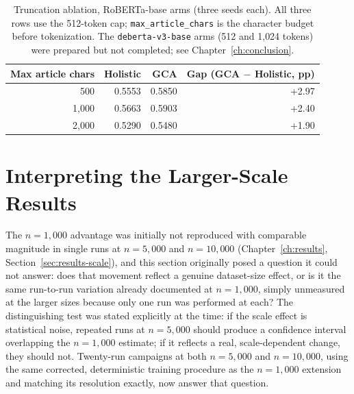 \begin{table}[htbp]
\centering
\caption[Truncation ablation, RoBERTa-base arms]{Truncation ablation, RoBERTa-base arms (three seeds each). All three
rows use the 512-token cap; \texttt{max\_article\_chars} is the character budget
before tokenization. The \texttt{deberta-v3-base} arms (512 and 1{,}024 tokens)
were prepared but not completed; see Chapter~\ref{ch:conclusion}.}
\label{tab:truncation-ablation}
\begin{tabular}{rrrr}
\toprule
Max article chars & Holistic & GCA & Gap (GCA $-$ Holistic, pp) \\
\midrule
500   & 0.5553 & 0.5850 & +2.97 \\
1{,}000 & 0.5663 & 0.5903 & +2.40 \\
2{,}000 & 0.5290 & 0.5480 & +1.90\footnotemark \\
\bottomrule
\end{tabular}
\end{table}

\section{Interpreting the Larger-Scale Results}
\label{sec:disc-scale}

The $n=1{,}000$ advantage was initially not reproduced with comparable
magnitude in single runs at $n=5{,}000$ and $n=10{,}000$ (Chapter~\ref{ch:results},
Section~\ref{sec:results-scale}), and this section originally posed a question
it could not answer: does that movement reflect a genuine dataset-size effect,
or is it the same run-to-run variation already documented at $n=1{,}000$,
simply unmeasured at the larger sizes because only one run was performed at
each? The distinguishing test was stated explicitly at the time: if the scale
effect is statistical noise, repeated runs at $n=5{,}000$ should produce a
confidence interval overlapping the $n=1{,}000$ estimate; if it reflects a
real, scale-dependent change, they should not. Twenty-run campaigns at both
$n=5{,}000$ and $n=10{,}000$, using the same corrected, deterministic training
procedure as the $n=1{,}000$ extension and matching its resolution exactly,
now answer that question.

